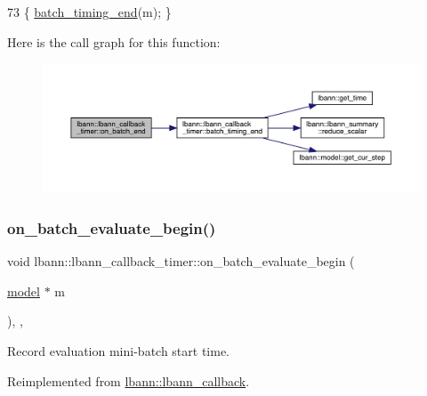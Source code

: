 \begin{DoxyCode}
73 \{ \hyperlink{classlbann_1_1lbann__callback__timer_afbf58bd4e1b4c1bcae2e50f78c9507f0}{batch\_timing\_end}(m); \}
\end{DoxyCode}
Here is the call graph for this function\+:\nopagebreak
\begin{figure}[H]
\begin{center}
\leavevmode
\includegraphics[width=350pt]{classlbann_1_1lbann__callback__timer_aff885381753dfc63709531aebc827b0e_cgraph}
\end{center}
\end{figure}
\mbox{\label{classlbann_1_1lbann__callback__timer_abef3c43404a7453a383fe47728d3283b}} 
\subsubsection{\texorpdfstring{on\+\_\+batch\+\_\+evaluate\+\_\+begin()}{on\_batch\_evaluate\_begin()}}
{\footnotesize\ttfamily void lbann\+::lbann\+\_\+callback\+\_\+timer\+::on\+\_\+batch\+\_\+evaluate\+\_\+begin (\begin{DoxyParamCaption}\item[{\hyperlink{classlbann_1_1model}{model} $\ast$}]{m }\end{DoxyParamCaption})\hspace{0.3cm}{\ttfamily [inline]}, {\ttfamily [override]}, {\ttfamily [virtual]}}

Record evaluation mini-\/batch start time. 

Reimplemented from \hyperlink{classlbann_1_1lbann__callback_a3462e54126adbd0082c22c98d8de5468}{lbann\+::lbann\+\_\+callback}.



